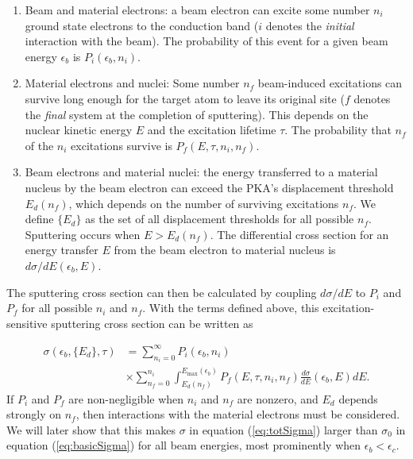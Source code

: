 \documentclass[twoside,twocolumn,9pt]{article}
\begin{document}
\begin{enumerate}
  \item Beam and material electrons:
    a beam electron can excite some number $n_i$ ground state electrons to the
    conduction band ($i$ denotes the \textit{initial} interaction with the
    beam).
    The probability of this event for a given beam energy $\epsilon_b$ is
    $P_i(\epsilon_b, n_i)$.
  \item Material electrons and nuclei:
    Some number $n_f$ beam-induced excitations can survive long enough for the
    target atom to leave its original site ($f$ denotes the \textit{final}
    system at the completion of sputtering).
    This depends on the nuclear kinetic energy $E$ and the excitation lifetime
    $\tau$.
    The probability that $n_f$ of the $n_i$ excitations survive is $P_f(E,
    \tau, n_i, n_f)$.
  \item Beam electrons and material nuclei: the energy transferred to a
    material nucleus by the beam electron can exceed the PKA's displacement
    threshold $E_d(n_f)$, which depends on the number of surviving excitations
    $n_f$.  We define $\{{E}_d\}$ as the set of all displacement thresholds for
    all possible $n_f$.  Sputtering occurs when $E>E_d(n_f)$.  The differential
    cross section for an energy transfer $E$ from the beam electron to
    material nucleus is $d\sigma/dE(\epsilon_b, E)$.
\end{enumerate}

\noindent
The sputtering cross section can then be calculated by coupling $d\sigma/dE$ to
$P_i$ and $P_f$ for all possible $n_i$ and $n_f$.
With the terms defined above, this excitation-sensitive sputtering cross
section can be written as

\begin{equation}
  \begin{aligned}
    \sigma(\epsilon_b, \{{E}_d\}, \tau)
    &=
    \sum_{n_i=0}^\infty
    P_i(\epsilon_b, n_i)
    \\&\times
    \sum_{n_f=0}^{n_i}
    \int_{E_d(n_f)}^{E_\text{max}(\epsilon_b)}
    P_f(E, \tau, n_i, n_f)
    \frac{d\sigma}{dE}(\epsilon_b, E)
    dE.
  \end{aligned}
  \label{eq:totSigma}
\end{equation}
%
If $P_i$ and $P_f$ are non-negligible when $n_i$ and $n_f$ are nonzero, and
$E_d$ depends strongly on $n_f$, then interactions with the material electrons
must be considered.
We will later show that this makes $\sigma$ in equation (\ref{eq:totSigma})
larger than $\sigma_0$ in equation (\ref{eq:basicSigma}) for all beam energies,
most prominently when $\epsilon_b < \epsilon_c$.
\end{document}
